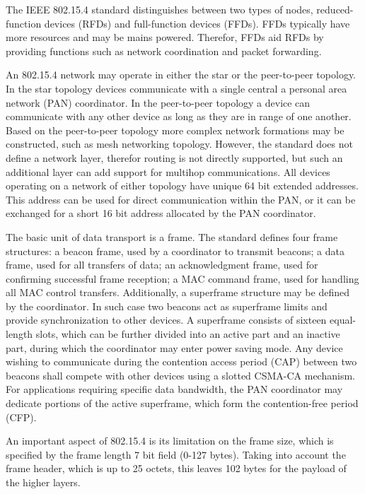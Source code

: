 \documentclass[12pt, titlepage, a4paper]{report}
\begin{document}
The IEEE 802.15.4 standard distinguishes between two types of nodes, reduced-function devices (RFDs) and full-function devices (FFDs).                                   FFDs typically have more resources and may be mains powered.  Therefor, FFDs aid RFDs by providing functions such as network coordination and packet forwarding.

An 802.15.4 network may operate in either the star or the peer-to-peer topology. In the star topology devices communicate with a single central                           a personal area network (PAN) coordinator. In the peer-to-peer topology a device can communicate with any other device as long as they are in range of one another. Based on the peer-to-peer topology more complex network formations may be constructed, such as mesh networking topology. However, the standard does not define a network layer, therefor routing is not directly supported, but such an additional layer can add support for multihop communications. All devices operating on a network of either topology have unique 64 bit extended addresses. This address can be used for direct communication within the PAN, or it can be exchanged for a short 16 bit address allocated by the PAN coordinator.

The basic unit of data transport is a frame. The standard defines four frame structures: a beacon frame, used by a coordinator to transmit beacons;
a data frame, used for all transfers of data; an acknowledgment frame, used for confirming successful frame reception; a MAC command frame, used for handling all MAC control transfers. Additionally, a superframe structure may be defined by the coordinator. In such case two beacons act as superframe limits and provide synchronization to other devices. A superframe consists of sixteen equal-length slots, which can be further divided into an active part and an inactive part, during which the coordinator may enter power saving mode. Any device wishing to communicate during the contention access period (CAP) between two beacons shall compete with other devices using a slotted CSMA-CA mechanism. For applications requiring specific data bandwidth, the PAN coordinator may dedicate portions of the active superframe, which form the contention-free period (CFP).

An important aspect of 802.15.4 is its limitation on the frame size, which is specified by the frame length 7 bit field (0-127 bytes). Taking into account the frame header, which is up to 25 octets, this leaves 102 bytes for the payload of the higher layers.
\end{document}
